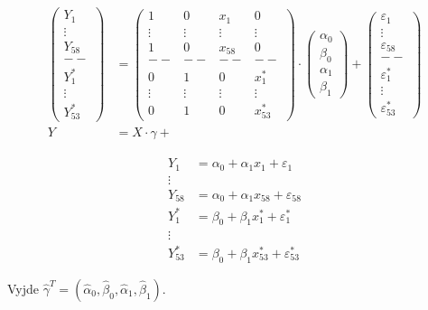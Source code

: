 \documentclass[unknownkeysallowed]{article}
\begin{document}
\begin{align*}
\left(\begin{matrix}
Y_1\\
\vdots\\
Y_{58}\\
--\\
Y^*_1\\
\vdots\\
Y^*_{53}
\end{matrix}\right)
&=
\left(\begin{matrix}
1 & 0 & x_1 & 0\\
\vdots & \vdots & \vdots & \vdots \\
1 & 0 & x_{58} & 0\\
--&--&--&--\\
0 & 1 & 0 & x^*_1\\
\vdots & \vdots & \vdots & \vdots \\
0 & 1 & 0 & x^*_{53}
\end{matrix}\right)
\cdot
\left(\begin{matrix}
\alpha_0\\
\beta_0\\
\alpha_1\\
\beta_1
\end{matrix}\right)
+
\left(\begin{matrix}
\varepsilon_1\\
\vdots\\
\varepsilon_{58}\\
--\\
\varepsilon^*_1\\
\vdots\\
\varepsilon^*_{53}
\end{matrix}\right) \\ 
Y &= X\cdot\gamma + 
\end{align*}

\begin{align*}
Y_1 &= \alpha_0 + \alpha_1x_1 + \varepsilon_1\\
\vdots\\
Y_{58} &= \alpha_0 + \alpha_1x_{58} + \varepsilon_{58}\\
Y^*_1 &= \beta_0 + \beta_1x^*_1 + \varepsilon^*_1\\
\vdots\\
Y^*_{53} &= \beta_0 + \beta_1x^*_{53} + \varepsilon^*_{53}
\end{align*}

Vyjde $\hat{\gamma}^T = (\hat{\alpha}_0, \hat{\beta}_0, \hat{\alpha}_1, \hat{\beta}_1)$.
\end{document}
